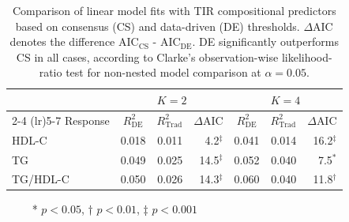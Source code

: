 \begin{table}[htbp]
\centering
\caption{Comparison of linear model fits with TIR compositional predictors based on consensus (CS) and data-driven (DE) thresholds. $\Delta$AIC denotes the difference AIC$_{\text{CS}}$ - AIC$_{\text{DE}}$. DE significantly outperforms CS in all cases, according to Clarke's observation-wise likelihood-ratio test for non-nested model comparison at  $\alpha = 0.05$.}
\label{tab:lm_results}
\small
\begin{tabular}{lrrrrrr}
\toprule
 & \multicolumn{3}{c}{$K=2$} & \multicolumn{3}{c}{$K=4$} \\
\cmidrule(lr){2-4} \cmidrule(lr){5-7} Response & \multicolumn{1}{c}{$R^2_{\text{DE}}$} & \multicolumn{1}{c}{$R^2_{\text{Trad}}$} & \multicolumn{1}{c}{$\Delta$AIC} & \multicolumn{1}{c}{$R^2_{\text{DE}}$} & \multicolumn{1}{c}{$R^2_{\text{Trad}}$} & \multicolumn{1}{c}{$\Delta$AIC} \\
\midrule
HDL-C & 0.018 & 0.011 & 4.2$^\ddagger$ & 0.041 & 0.014 & 16.2$^\ddagger$ \\
TG & 0.049 & 0.025 & 14.5$^\ddagger$ & 0.052 & 0.040 & 7.5$^*$ \\
TG/HDL-C & 0.050 & 0.026 & 14.3$^\ddagger$ & 0.060 & 0.040 & 11.8$^\dagger$ \\
\bottomrule
\end{tabular}
\begin{tablenotes}
\footnotesize
\item $\qquad$ * $p<0.05$, † $p<0.01$, ‡ $p<0.001$
\end{tablenotes}
\end{table}